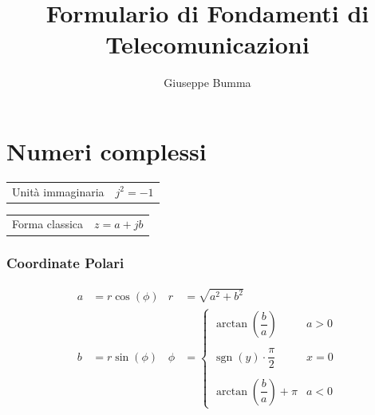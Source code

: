 \documentclass{article}
\title{Formulario di Fondamenti di Telecomunicazioni}
\author{Giuseppe Bumma}
\DeclareMathOperator{\sgn}{\text{sgn}}
\begin{document}
\newcommand{\R}{\mathbb{R}}
\newcommand{\bb}[1]{\mathbb{#1}}
\newcommand{\cc}[1]{\mathcal{#1}}
\newcommand{ \lognormal }{\text{Lognormal} }
\newcommand{\tb}[1]{\textbf{#1}}
\newcommand*\circled[1]{\tikz[baseline=(char.base)]{%
            \node[shape=circle,draw,inner sep=2pt] (char) {#1};}}


\tableofcontents

\maketitle

\section{Numeri complessi}
\begin{center}
    \renewcommand{\arraystretch}{2.5}
    \begin{tabular}{c c}
        Unità immaginaria & $j^2=-1$\\
    \end{tabular}
    \begin{tabular}{c c}
        Forma classica & $z = a + jb$\\
    \end{tabular}
\end{center}
\subsubsection*{Coordinate Polari}
\begin{align*}
    a &= r \cos(\phi) & r &= \sqrt{a^2 + b^2}\\
    b &= r \sin (\phi) & \phi &= 
    \begin{cases}
        \arctan\left( \dfrac{b}{a} \right) &a > 0\\
        \\
        \sgn(y) \cdot \dfrac{\pi}{2} &x=0\\
        \\
        \arctan \left( \dfrac{b}{a} \right) + \pi &a<0
    \end{cases}
\end{align*}
\subsubsection*{}
\end{document}
